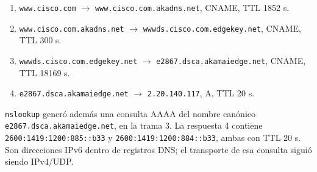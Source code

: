 \documentclass[11pt,a4paper]{article}
\begin{document}
\begin{enumerate}[noitemsep]
\item \nolinkurl{www.cisco.com} $\rightarrow$ \nolinkurl{www.cisco.com.akadns.net}, CNAME, TTL 1852 s.
\item \nolinkurl{www.cisco.com.akadns.net} $\rightarrow$ \nolinkurl{wwwds.cisco.com.edgekey.net}, CNAME, TTL 300 s.
\item \nolinkurl{wwwds.cisco.com.edgekey.net} $\rightarrow$ \nolinkurl{e2867.dsca.akamaiedge.net}, CNAME, TTL 18169 s.
\item \nolinkurl{e2867.dsca.akamaiedge.net} $\rightarrow$ \nolinkurl{2.20.140.117}, A, TTL 20 s.
\end{enumerate}

\texttt{nslookup} generó además una consulta AAAA del nombre canónico
\nolinkurl{e2867.dsca.akamaiedge.net}, en la trama 3. La respuesta 4 contiene
\texttt{2600:1419:1200:885::b33} y \texttt{2600:1419:1200:884::b33}, ambas
con TTL 20 s. Son direcciones IPv6 dentro de registros DNS; el transporte
de esa consulta siguió siendo IPv4/UDP.
\end{document}
